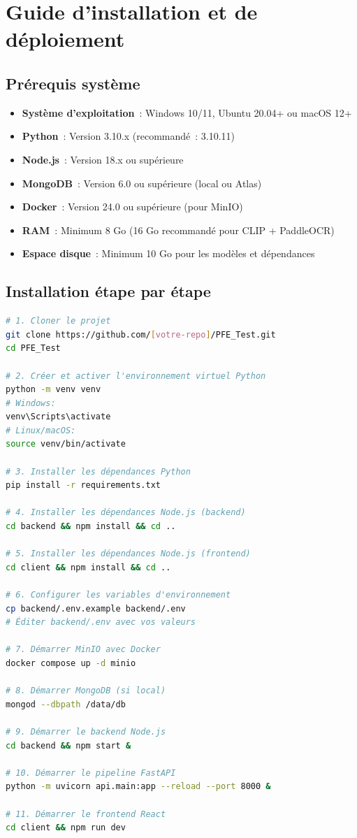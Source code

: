 \chapter{Guide d'installation et de déploiement}
\label{annexe:install}

\section{Prérequis système}

\begin{itemize}
  \item \textbf{Système d'exploitation}~: Windows 10/11, Ubuntu 20.04+ ou macOS 12+
  \item \textbf{Python}~: Version 3.10.x (recommandé~: 3.10.11)
  \item \textbf{Node.js}~: Version 18.x ou supérieure
  \item \textbf{MongoDB}~: Version 6.0 ou supérieure (local ou Atlas)
  \item \textbf{Docker}~: Version 24.0 ou supérieure (pour MinIO)
  \item \textbf{RAM}~: Minimum 8 Go (16 Go recommandé pour CLIP + PaddleOCR)
  \item \textbf{Espace disque}~: Minimum 10 Go pour les modèles et dépendances
\end{itemize}

\section{Installation étape par étape}

\begin{lstlisting}[language=bash, caption={Procédure d'installation complète}, label={lst:install}]
# 1. Cloner le projet
git clone https://github.com/[votre-repo]/PFE_Test.git
cd PFE_Test

# 2. Créer et activer l'environnement virtuel Python
python -m venv venv
# Windows:
venv\Scripts\activate
# Linux/macOS:
source venv/bin/activate

# 3. Installer les dépendances Python
pip install -r requirements.txt

# 4. Installer les dépendances Node.js (backend)
cd backend && npm install && cd ..

# 5. Installer les dépendances Node.js (frontend)
cd client && npm install && cd ..

# 6. Configurer les variables d'environnement
cp backend/.env.example backend/.env
# Éditer backend/.env avec vos valeurs

# 7. Démarrer MinIO avec Docker
docker compose up -d minio

# 8. Démarrer MongoDB (si local)
mongod --dbpath /data/db

# 9. Démarrer le backend Node.js
cd backend && npm start &

# 10. Démarrer le pipeline FastAPI
python -m uvicorn api.main:app --reload --port 8000 &

# 11. Démarrer le frontend React
cd client && npm run dev
\end{lstlisting}

